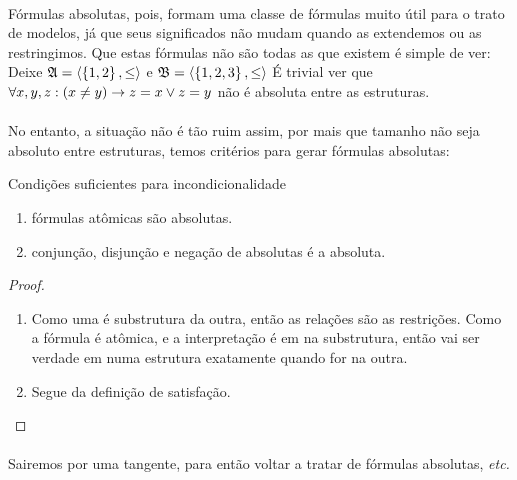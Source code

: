             \paragraph{}
                Fórmulas absolutas, pois, formam uma classe de fórmulas muito útil para o trato
                de modelos, já que seus significados não mudam quando as extendemos ou as
                restringimos. Que estas fórmulas não são todas as que existem é simple de ver:
                Deixe
                $\mathfrak{A} = \TUPLE{\SET{1}{2}}{\leq}$  e
                $\mathfrak{B} = \TUPLE{\SET{1}{2}{3}}{\leq}$
                É trivial ver que $\forall x,y,z: (x\not= y)\rightarrow z=x\lor z=y$ 
                não é absoluta entre as estruturas.
            \paragraph{}
                No entanto, a situação não é tão ruim assim, por mais que tamanho não 
                seja absoluto entre estruturas, temos critérios para gerar fórmulas 
                absolutas:
            \begin{proposition}{Condições suficientes para incondicionalidade}
                \begin{enumerate}[label=\alph*)]
                    \item fórmulas atômicas são absolutas.
                    \item conjunção, disjunção e negação de absolutas é a absoluta.
                \end{enumerate}
                \begin{proof}
                    \begin{enumerate}[label=\alph*)]
                        \item 
                            Como uma é substrutura da outra, então as relações são as 
                            restrições. Como a fórmula é atômica, e a interpretação é 
                            em na substrutura, então vai ser verdade em numa estrutura
                            exatamente quando for na outra.
                        \item 
                            Segue da definição de satisfação.
                    \end{enumerate}
                \end{proof}
            \end{proposition}
            \paragraph{}
                Sairemos por uma tangente, para então voltar a tratar de fórmulas absolutas, \emph{etc.}
